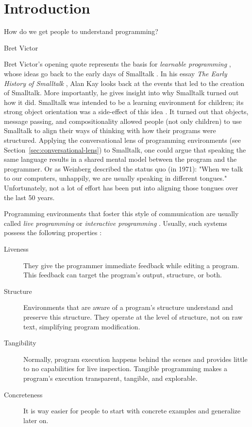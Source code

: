 \chapter{Introduction}
\label{cha:introduction}
\epigraph{How do we get people to understand programming?}{Bret Victor}

\noindent
Bret Victor's opening quote represents the basis for \emph{learnable programming} \cite{victor_learnable_2012}, whose ideas go back to the early days of Smalltalk \cite{kay_early_1993}.
In his essay \emph{The Early History of Smalltalk} \cite{kay_early_1993}, Alan Kay looks back at the events that led to the creation of Smalltalk.
More importantly, he gives insight into why Smalltalk turned out how it did.
Smalltalk was intended to be a learning environment for children; its strong object orientation was a side-effect of this idea \cite{kay_early_1993}.
It turned out that objects, message passing, and compositionality allowed people (not only children) to use Smalltalk to align their ways of thinking with how their programs were structured.
Applying the conversational lens of programming environments (see Section~\ref{sec:conversational-lens}) to Smalltalk, one could argue that speaking the same language results in a shared mental model between the program and the programmer.
Or as Weinberg described the status quo (in 1971): "When we talk to our computers, unhappily, we are usually speaking in different tongues." \cite{weinberg_psychology_1971}
Unfortunately, not a lot of effort has been put into aligning those tongues over the last 50 years.

Programming environments that foster this style of communication are usually called \emph{live programming} \cite{aguiar_live_2019, church_liveness_2010} or \emph{interactive programming} \cite{czaplicki_interactive_2013, mccabe_towards_2023}.
Usually, such systems possess the following properties \cite{burg_1st_2013}:
\begin{description}
    \item[Liveness] They give the programmer immediate feedback while editing a program. This feedback can target the program's output, structure, or both.
    \item[Structure] Environments that are aware of a program's structure understand and preserve this structure. They operate at the level of structure, not on raw text, simplifying program modification.
    \item[Tangibility] Normally, program execution happens behind the scenes and provides little to no capabilities for live inspection. Tangible programming makes a program's execution transparent, tangible, and explorable.
    \item[Concreteness] It is way easier for people to start with concrete examples and generalize later on.
\end{description}

